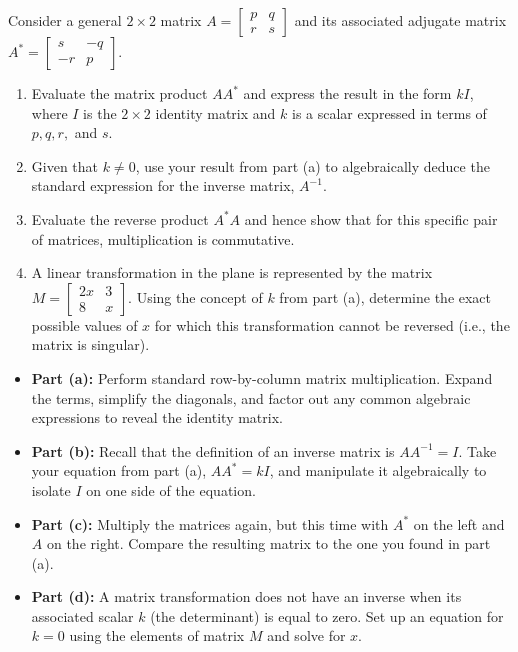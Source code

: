 \begin{problem}
Consider a general $2 \times 2$ matrix $A = \begin{bmatrix} p & q \\ r & s \end{bmatrix}$ and its associated adjugate matrix $A^* = \begin{bmatrix} s & -q \\ -r & p \end{bmatrix}$.

\begin{enumerate}[label=\textbf{(\alph*)}]
    \item Evaluate the matrix product $A A^*$ and express the result in the form $kI$, where $I$ is the $2 \times 2$ identity matrix and $k$ is a scalar expressed in terms of $p, q, r,$ and $s$.
    \item Given that $k \neq 0$, use your result from part (a) to algebraically deduce the standard expression for the inverse matrix, $A^{-1}$.
    \item Evaluate the reverse product $A^* A$ and hence show that for this specific pair of matrices, multiplication is commutative.
    \item A linear transformation in the plane is represented by the matrix $M = \begin{bmatrix} 2x & 3 \\ 8 & x \end{bmatrix}$. Using the concept of $k$ from part (a), determine the exact possible values of $x$ for which this transformation cannot be reversed (i.e., the matrix is singular).
\end{enumerate}
\end{problem}

\begin{hint}
\begin{itemize}
    \item \textbf{Part (a):} Perform standard row-by-column matrix multiplication. Expand the terms, simplify the diagonals, and factor out any common algebraic expressions to reveal the identity matrix.
    \item \textbf{Part (b):} Recall that the definition of an inverse matrix is $A A^{-1} = I$. Take your equation from part (a), $A A^* = kI$, and manipulate it algebraically to isolate $I$ on one side of the equation.
    \item \textbf{Part (c):} Multiply the matrices again, but this time with $A^*$ on the left and $A$ on the right. Compare the resulting matrix to the one you found in part (a).
    \item \textbf{Part (d):} A matrix transformation does not have an inverse when its associated scalar $k$ (the determinant) is equal to zero. Set up an equation for $k = 0$ using the elements of matrix $M$ and solve for $x$.
\end{itemize}
\end{hint}

